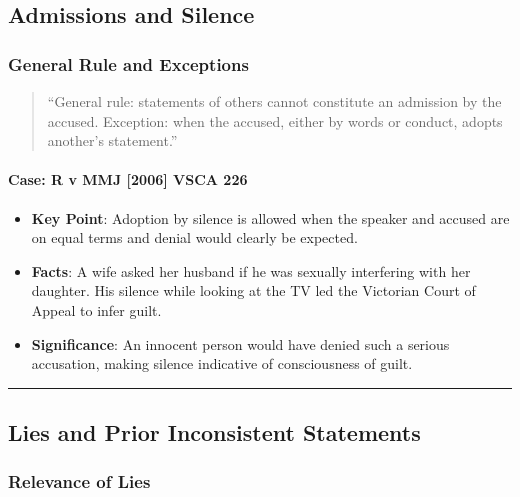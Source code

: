 \subsection{  Admissions and Silence}\label{admissions-and-silence}

\subsubsection{General Rule and
Exceptions}\label{general-rule-and-exceptions}

\begin{quote}
``General rule: statements of others cannot constitute an admission by
the accused. Exception: when the accused, either by words or conduct,
adopts another's statement.''
\end{quote}

\paragraph{Case: R v MMJ {[}2006{]} VSCA
226}\label{case-r-v-mmj-2006-vsca-226}

\begin{itemize}
\tightlist
\item
  \textbf{Key Point}: Adoption by silence is allowed when the speaker
  and accused are on equal terms and denial would clearly be expected.
\item
  \textbf{Facts}: A wife asked her husband if he was sexually
  interfering with her daughter. His silence while looking at the TV led
  the Victorian Court of Appeal to infer guilt.
\item
  \textbf{Significance}: An innocent person would have denied such a
  serious accusation, making silence indicative of consciousness of
  guilt.
\end{itemize}

\begin{center}\rule{0.5\linewidth}{0.5pt}\end{center}

\subsection{  Lies and Prior Inconsistent
Statements}\label{lies-and-prior-inconsistent-statements}

\subsubsection{Relevance of Lies}\label{relevance-of-lies}

